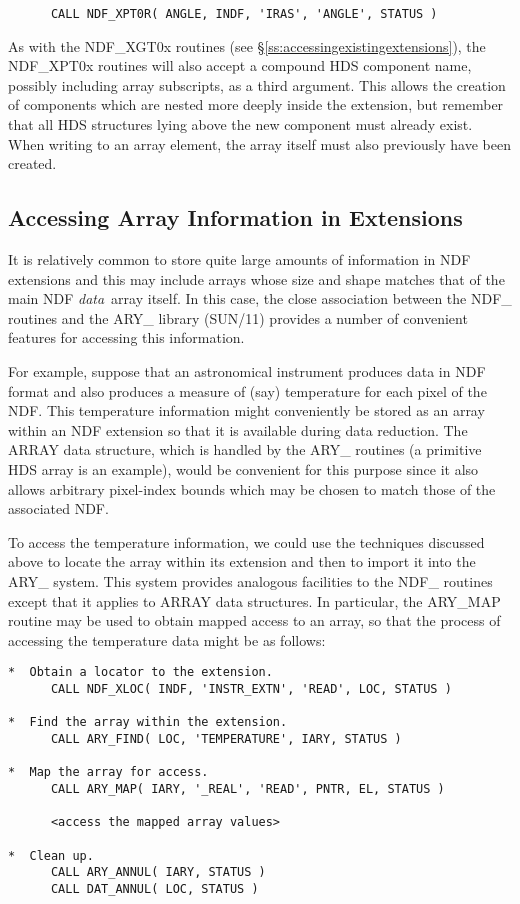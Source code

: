 \documentclass[twoside,11pt]{article}
\newcommand{\htmlref}[2]{#1}
\newcommand{\xref}[3]{#1}
\newcommand{\xlabel}[1]{}
\newcommand{\st}[1]{{\em{#1}}}
\begin{document}
\small
\begin{verbatim}
      CALL NDF_XPT0R( ANGLE, INDF, 'IRAS', 'ANGLE', STATUS )
\end{verbatim}
\normalsize

As with the \htmlref{NDF\_XGT0x}{NDF_XGT0x} routines (see
\S\ref{ss:accessingexistingextensions}), the NDF\_XPT0x routines will
also accept a compound HDS component name, possibly including array
subscripts, as a third argument. This allows the creation of
components which are nested more deeply inside the extension, but
remember that all HDS structures lying above the new component must
already exist.  When writing to an array element, the array itself
must also previously have been created.

\subsection{\xlabel{accessing_array_information_in_extensions}\label{ss:extnarrays}Accessing Array Information in Extensions}

It is relatively common to store quite large amounts of information in NDF
extensions and this may include arrays whose size and shape matches that of the
main NDF \st{data}\ array itself. In this case, the close association between
the NDF\_ routines and the ARY\_ library (\xref{SUN/11}{sun11}{})
provides a number of convenient features for accessing this
information.

For example, suppose that an astronomical instrument produces data in
NDF format and also produces a measure of (say) temperature for each
pixel of the NDF. This temperature information might conveniently be
stored as an array within an NDF extension so that it is available
during data reduction. The ARRAY data structure, which is handled by
the ARY\_ routines (a primitive \xref{HDS}{sun92}{} array is an
example), would be convenient for this purpose since it also allows
arbitrary pixel-index bounds which may be chosen to match those of the
associated NDF.

To access the temperature information, we could use the techniques discussed
above to locate the array within its extension and then to import it into the
ARY\_ system. This system provides analogous facilities to the NDF\_ routines
except that it applies to ARRAY data structures. In particular, the ARY\_MAP
routine may be used to obtain mapped access to an array, so that the process of
accessing the temperature data might be as follows:

\small
\begin{verbatim}
*  Obtain a locator to the extension.
      CALL NDF_XLOC( INDF, 'INSTR_EXTN', 'READ', LOC, STATUS )

*  Find the array within the extension.
      CALL ARY_FIND( LOC, 'TEMPERATURE', IARY, STATUS )

*  Map the array for access.
      CALL ARY_MAP( IARY, '_REAL', 'READ', PNTR, EL, STATUS )

      <access the mapped array values>

*  Clean up.
      CALL ARY_ANNUL( IARY, STATUS )
      CALL DAT_ANNUL( LOC, STATUS )
\end{verbatim}
\normalsize
\end{document}
